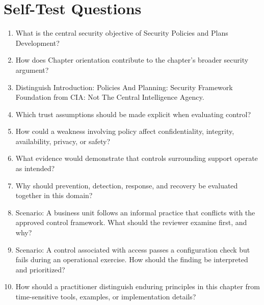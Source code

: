 \documentclass[11pt,letterpaper]{article}
\begin{document}
\section*{Self-Test Questions}
\begin{enumerate}
\item What is the central security objective of Security Policies and Plans Development?
\item How does Chapter orientation contribute to the chapter's broader security argument?
\item Distinguish Introduction: Policies And Planning: Security Framework Foundation from CIA: Not The Central Intelligence Agency.
\item Which trust assumptions should be made explicit when evaluating control?
\item How could a weakness involving policy affect confidentiality, integrity, availability, privacy, or safety?
\item What evidence would demonstrate that controls surrounding support operate as intended?
\item Why should prevention, detection, response, and recovery be evaluated together in this domain?
\item Scenario: A business unit follows an informal practice that conflicts with the approved control framework. What should the reviewer examine first, and why?
\item Scenario: A control associated with access passes a configuration check but fails during an operational exercise. How should the finding be interpreted and prioritized?
\item How should a practitioner distinguish enduring principles in this chapter from time-sensitive tools, examples, or implementation details?
\end{enumerate}
\end{document}
